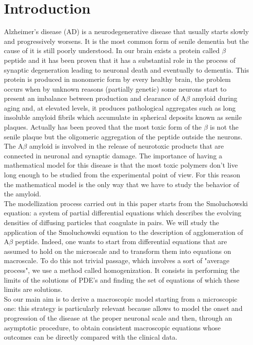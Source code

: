 \section{Introduction}
Alzheimer's disease (AD) is a neurodegenerative disease that usually starts slowly and progressively worsens. It is the most common form of senile dementia but the cause of it is still poorly understood. 
In our brain exists a protein called \(\beta\) peptide and it has been proven that it has a substantial role in the process of synaptic degeneration leading to neuronal death and eventually to dementia. This protein is produced in monomeric form by every healthy brain, the problem occurs when  by unknown reasons (partially genetic) some neurons start to present an imbalance between production and clearance of $\mathrm{A} \beta$ amyloid during aging and, at elevated levels, it produces pathological aggregates such as long insoluble amyloid fibrils which accumulate in spherical deposits known as senile plaques. Actually has been proved that the most toxic form of the \(\beta\) is not the senile plaque but the oligomeric aggregation of the peptide outside the neurons. The $\mathrm{A} \beta$ amyloid is involved in the release of neurotoxic products that are connected in neuronal and synaptic damage. 
The importance of having a mathematical model for this disease is that the most toxic polymers don't live long enough to be studied from the experimental point of view. For this reason the mathematical model is the only way that we have to study the behavior of the amyloid.\\
The modellization process carried out in this paper starts from the Smoluchowski equation: a system of partial differential equations which describes the evolving densities of diffusing particles that coagulate in pairs. We will study the application of the Smoluchowski equation to the description of agglomeration of $\mathrm{A} \beta$ peptide. Indeed, one wants to start from differential equations that are assumed to hold on the microscale and to transform them into equations on macroscale. To do this not trivial passage, which involves a sort of "average process", we use a method called homogenization. It consists in performing the limits of the solutions of PDE's and finding the set of equations of which these limits are solutions. \\
So our main aim is to derive a macroscopic model starting from a microscopic one: this strategy is particularly relevant because allows to model the onset and progression of the disease at the proper neuronal scale and then, through an asymptotic procedure, to obtain consistent macroscopic equations whose outcomes can be directly compared with the clinical data.
